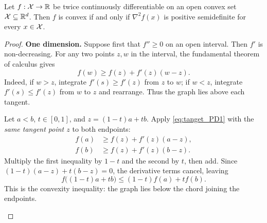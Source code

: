 \begin{theorem}
\label{thm:hessian_convexity}
Let $f:{\mathcal X}\to\mathbb{R}$ be twice continuously differentiable on an open convex set ${\mathcal X}\subseteq\mathbb{R}^d$. Then $f$ is convex if and only if $\nabla^2 f(x)$ is positive semidefinite for every $x\in{\mathcal X}$.
\end{theorem}
\begin{proof}
\textbf{One dimension.} Suppose first that $f''\geq0$ on an open interval. Then $f'$ is non-decreasing. For any two points $z,w$ in the interval, the fundamental theorem of calculus gives
\begin{equation}
    f(w)\geq f(z)+f'(z)(w-z).
    \label{eq:tanget_PD1}
\end{equation}
Indeed, if $w>z$, integrate $f'(s)\geq f'(z)$ from $z$ to $w$; if $w<z$, integrate $f'(s)\leq f'(z)$ from $w$ to $z$ and rearrange. Thus the graph lies above each tangent.

Let $a<b$, $t\in[0,1]$, and $z=(1-t)a+tb$. Apply \eqref{eq:tanget_PD1} with the \emph{same tangent point $z$} to both endpoints:
\begin{align}
    f(a)&\geq f(z)+f'(z)(a-z),\\
    f(b)&\geq f(z)+f'(z)(b-z).
\end{align}
Multiply the first inequality by $1-t$ and the second by $t$, then add. Since $(1-t)(a-z)+t(b-z)=0$, the derivative terms cancel, leaving
\begin{equation}
    f\bigl((1-t)a+tb\bigr)\leq(1-t)f(a)+tf(b).
\end{equation}
This is the convexity inequality: the graph lies below the chord joining the endpoints.

\begin{center}
\begin{minipage}{0.9\linewidth}
\centering
{}


\end{minipage}
\end{center}
\end{proof}

